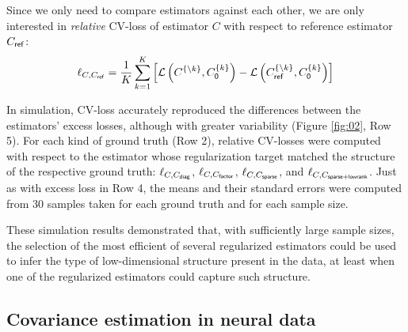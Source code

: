 \documentclass[10pt]{article}
\newcommand{\loss}[1]{\mathcal L\left(#1\right)}
\begin{document}
Since we only need to compare estimators against each other, we are only interested in \emph{relative} CV-loss of estimator $C$ with respect to reference estimator $C_{\sf ref}$:
\begin{equation}\label{eq:rel-cv-loss}
    \ell_{C,C_{\sf ref}} = \frac 1 K \sum\limits_{k=1}^K \left[
        \loss{C^{\{\setminus k\}},C_{\sf 0}^{\{k\}}} -
    \loss{C_{\sf ref}^{\{\setminus k\}},C_{\sf 0}^{\{k\}}} 
\right]
\end{equation}

In simulation, CV-loss accurately reproduced the differences between the estimators' excess losses, although with greater variability (Figure \ref{fig:02}, Row 5). For each kind of ground truth (Row 2), relative CV-losses were computed with respect to the estimator whose regularization target matched the structure of the respective ground truth: $\ell_{C,C_{\sf diag}}$, $\ell_{C,C_{\sf factor}}$, $\ell_{C,C_{\sf sparse}}$, and $\ell_{C,C_{\sf sparse+lowrank}}$. Just as with excess loss in Row 4, the means and their standard errors were computed from 30 samples  taken for each ground truth and for each sample size.

These simulation results demonstrated that, with sufficiently large sample sizes, the selection of the most efficient of several regularized estimators could be used to infer the type of low-dimensional structure present in the data, at least when one of the regularized estimators could capture such structure.

\subsection*{Covariance estimation in neural data}
\end{document}
